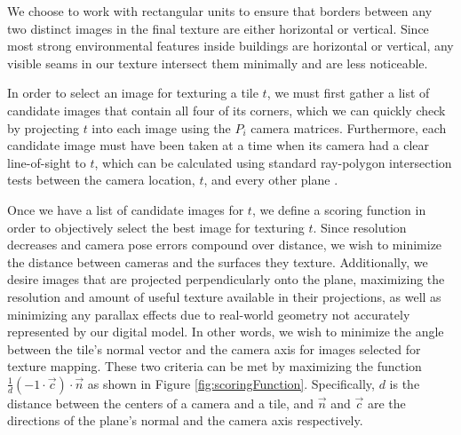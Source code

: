 \documentclass[]{spie}  %
\begin{document}
We choose to work with rectangular units to ensure that borders
between any two distinct images in the final texture are either
horizontal or vertical. Since most strong environmental features
inside buildings are horizontal or vertical, any visible seams in our
texture intersect them minimally and are less noticeable.

In order to select an image for texturing a tile $t$, we must first
gather a list of candidate images that contain all four of its
corners, which we can quickly check by projecting $t$ into each image
using the $P_i$ camera matrices. Furthermore, each candidate image
must have been taken at a time when its camera had a clear
line-of-sight to $t$, which can be calculated using standard
ray-polygon intersection tests between the camera location, $t$, and
every other plane \cite{rayintersection}.

Once we have a list of candidate images for $t$, we define a scoring
function in order to objectively select the best image for texturing
$t$. Since resolution decreases and camera pose errors compound over
distance, we wish to minimize the distance between cameras and the
surfaces they texture. Additionally, we desire images that are
projected perpendicularly onto the plane, maximizing the resolution
and amount of useful texture available in their projections, as well
as minimizing any parallax effects due to real-world geometry not
accurately represented by our digital model. In other words, we wish
to minimize the angle between the tile's normal vector and the camera
axis for images selected for texture mapping. These two criteria can
be met by maximizing the function $\frac{1}{d} (-1 \cdot \vec{c})
\cdot \vec{n}$ as shown in Figure
\ref{fig:scoringFunction}. Specifically, $d$ is the distance between
the centers of a camera and a tile, and $\vec{n}$ and $\vec{c}$ are
the directions of the plane's normal and the camera axis respectively.
\end{document}
